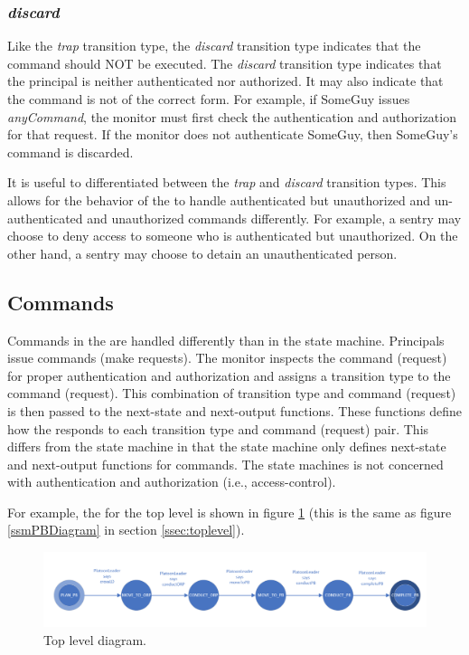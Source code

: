 \documentclass[../../main/main.tex]{subfiles}
\begin{document}
\subsubsection{\textit{discard}}
Like the \textit{trap} transition type, the \textit{discard} transition type indicates that the command should NOT be executed.  The \textit{discard} transition type indicates that the principal is neither authenticated nor authorized.  It may also indicate that the command is not of the correct form. For example, if SomeGuy issues \textit{anyCommand}, the monitor must first check the authentication and authorization for that request. If the monitor does not authenticate SomeGuy, then SomeGuy's command is discarded.

It is useful to differentiated between the \textit{trap} and \textit{discard} transition types.  This allows for the behavior of the  to handle authenticated but unauthorized and un-authenticated and unauthorized commands differently.  For example, a sentry may choose to deny access to someone who is authenticated but unauthorized.  On the other hand, a sentry may choose to detain an unauthenticated person.

\subsection{Commands}
Commands in the  are handled differently than in the state machine.  Principals issue commands (make requests).  The monitor inspects the command (request) for proper authentication and authorization and assigns a transition type to the command (request).  This combination of transition type and command (request) is then passed to the next-state and next-output functions.  These functions define how the  responds to each transition type and command (request) pair.  This differs from the state machine in that the state machine only defines next-state and next-output functions for commands.  The state machines is not concerned with authentication and authorization (i.e., access-control).

For example, the  for the top level is shown in figure \ref{ssmPBDiagram2} (this is the same as figure \ref{ssmPBDiagram} in section \ref{ssec:toplevel}).  

\begin{figure}[h!]
\centering
\includegraphics[width=\textwidth]{../figures/ssmPBDiagram}
\caption{\label{ssmPBDiagram2} Top level diagram.}
\end{figure}
\end{document}
